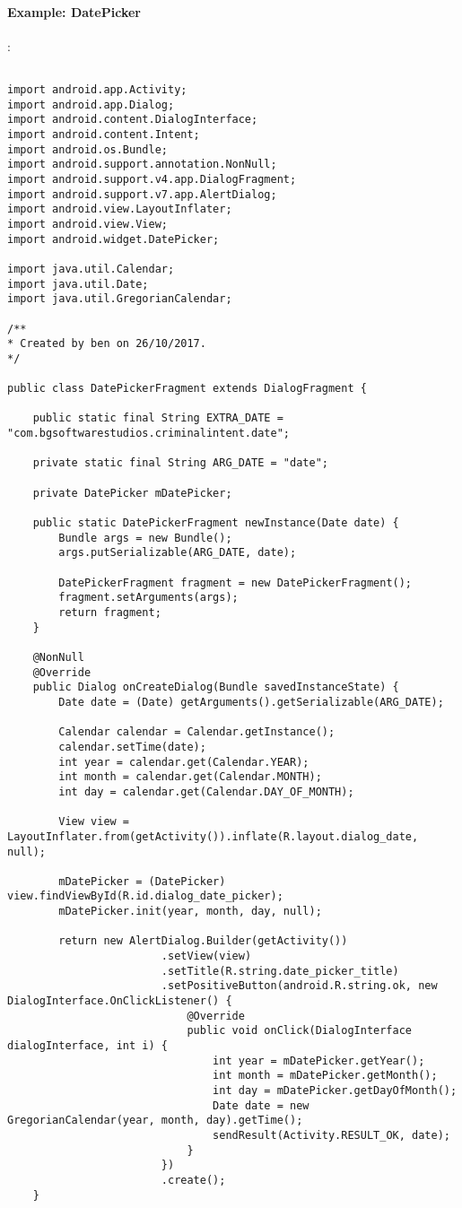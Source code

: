 \documentclass[]{article}
\begin{document}
\paragraph{Example: DatePicker}:
\begin{lstlisting}

import android.app.Activity;
import android.app.Dialog;
import android.content.DialogInterface;
import android.content.Intent;
import android.os.Bundle;
import android.support.annotation.NonNull;
import android.support.v4.app.DialogFragment;
import android.support.v7.app.AlertDialog;
import android.view.LayoutInflater;
import android.view.View;
import android.widget.DatePicker;

import java.util.Calendar;
import java.util.Date;
import java.util.GregorianCalendar;

/**
* Created by ben on 26/10/2017.
*/

public class DatePickerFragment extends DialogFragment {

	public static final String EXTRA_DATE = "com.bgsoftwarestudios.criminalintent.date";

	private static final String ARG_DATE = "date";

	private DatePicker mDatePicker;

	public static DatePickerFragment newInstance(Date date) {
		Bundle args = new Bundle();
		args.putSerializable(ARG_DATE, date);

		DatePickerFragment fragment = new DatePickerFragment();
		fragment.setArguments(args);
		return fragment;
	}

	@NonNull
	@Override
	public Dialog onCreateDialog(Bundle savedInstanceState) {
		Date date = (Date) getArguments().getSerializable(ARG_DATE);

		Calendar calendar = Calendar.getInstance();
		calendar.setTime(date);
		int year = calendar.get(Calendar.YEAR);
		int month = calendar.get(Calendar.MONTH);
		int day = calendar.get(Calendar.DAY_OF_MONTH);
		
		View view = LayoutInflater.from(getActivity()).inflate(R.layout.dialog_date, null);

		mDatePicker = (DatePicker) view.findViewById(R.id.dialog_date_picker);
		mDatePicker.init(year, month, day, null);

		return new AlertDialog.Builder(getActivity())
						.setView(view)
						.setTitle(R.string.date_picker_title)
						.setPositiveButton(android.R.string.ok, new DialogInterface.OnClickListener() {
							@Override
							public void onClick(DialogInterface dialogInterface, int i) {
								int year = mDatePicker.getYear();
								int month = mDatePicker.getMonth();
								int day = mDatePicker.getDayOfMonth();
								Date date = new GregorianCalendar(year, month, day).getTime();
								sendResult(Activity.RESULT_OK, date);
							}
						})
						.create();
	}


\end{lstlisting}
\end{document}
